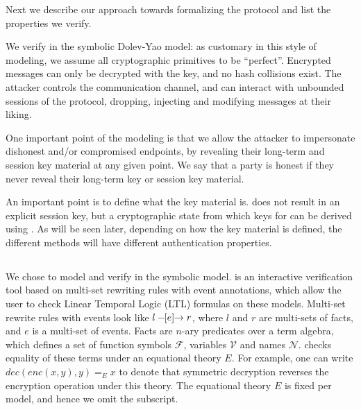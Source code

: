  
Next we describe our approach towards formalizing the \mEdhoc{} protocol and list the properties we verify. %
%
%

 
We verify \mEdhoc{} in the symbolic Dolev-Yao model: as customary in this style of
modeling, we assume all cryptographic primitives to be ``perfect''. Encrypted messages can only be decrypted with the key, and no hash collisions exist. The attacker controls the
 communication channel, and can interact with unbounded sessions of the protocol,
dropping, injecting and modifying messages at their liking.

One important point of the modeling is that we allow the attacker to impersonate
dishonest and/or compromised endpoints, by revealing their long-term and session
key material at any given point.
%
We say that a party is honest if they never reveal their
long-term key or session key material.

An important point is to define what the key material is.
    \mEdhoc{} does not result in an explicit session key, but a cryptographic
    state from which keys for \mOscore{} can be derived using \mHkdf.
    As will be seen later, depending on how the key material is defined, the
    different methods will have different authentication properties.

\subsection{\mTamarin{}}
\label{sec:tamarin}
 
We chose \mTamarin{} to model and verify \mEdhoc{} in the symbolic model.
%
\mTamarin{} is an interactive verification tool based on multi-set rewriting rules
with event annotations, which allow the user to check Linear Temporal Logic
(LTL) formulas on these models.
%
Multi-set rewrite rules with events look like $ l \ifarrow[e] r $,
where $l$ and $r$ are multi-sets of facts, and $e$ is a multi-set of events.
Facts are $n$-ary predicates over a term algebra, which defines a set of function
symbols $\mathcal F$, variables $\mathcal V$ and names $\mathcal N$. \mTamarin{}
checks equality of these terms under an equational theory $E$. For example,
one can write $ dec(enc(x,y),y) =_E x $
to denote that symmetric decryption reverses the encryption operation under this theory.
The equational theory $E$ is fixed per model, and hence we omit the subscript.

